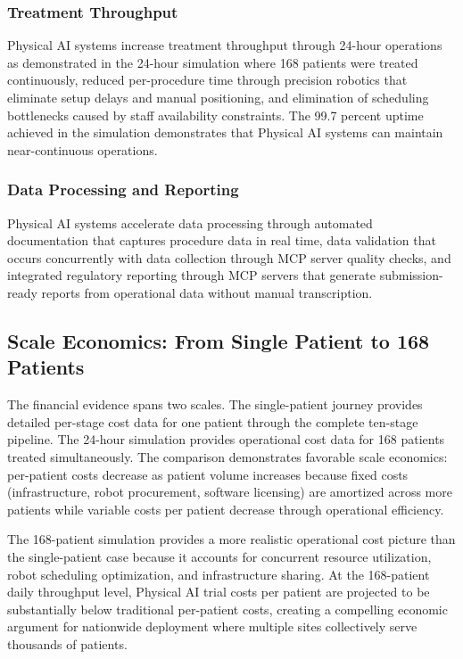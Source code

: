 \subsubsection{Treatment Throughput}

Physical AI systems increase treatment throughput through 24-hour operations
as demonstrated in the 24-hour simulation \cite{site-docs} where 168 patients
were treated continuously, reduced per-procedure time through precision
robotics that eliminate setup delays and manual positioning, and elimination of
scheduling bottlenecks caused by staff availability constraints. The 99.7
percent uptime achieved in the simulation demonstrates that Physical AI systems
can maintain near-continuous operations.

\subsubsection{Data Processing and Reporting}

Physical AI systems accelerate data processing through automated documentation
that captures procedure data in real time, data validation that occurs
concurrently with data collection through MCP server quality checks, and
integrated regulatory reporting through MCP servers \cite{national-mcp-paper}
that generate submission-ready reports from operational data without manual
transcription.

\subsection{Scale Economics: From Single Patient to 168 Patients}
\label{subsec:financial-scale}

The financial evidence spans two scales. The single-patient journey
\cite{patient-journey-paper} provides detailed per-stage cost data for one
patient through the complete ten-stage pipeline. The 24-hour simulation
\cite{site-docs} provides operational cost data for 168 patients treated
simultaneously. The comparison demonstrates favorable scale economics:
per-patient costs decrease as patient volume increases because fixed costs
(infrastructure, robot procurement, software licensing) are amortized across
more patients while variable costs per patient decrease through operational
efficiency.

The 168-patient simulation provides a more realistic operational cost picture
than the single-patient case because it accounts for concurrent resource
utilization, robot scheduling optimization, and infrastructure sharing. At the
168-patient daily throughput level, Physical AI trial costs per patient are
projected to be substantially below traditional per-patient costs, creating a
compelling economic argument for nationwide deployment where multiple sites
collectively serve thousands of patients.

